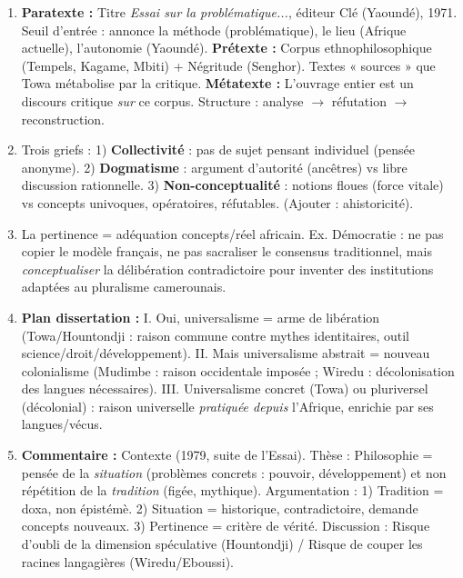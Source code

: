 \documentclass[11pt]{article}
\begin{document}
\begin{corrige}
\begin{enumerate}
    \item \textbf{Paratexte :} Titre \emph{Essai sur la problématique...}, éditeur Clé (Yaoundé), 1971. Seuil d'entrée : annonce la méthode (problématique), le lieu (Afrique actuelle), l'autonomie (Yaoundé). \textbf{Prétexte :} Corpus ethnophilosophique (Tempels, Kagame, Mbiti) + Négritude (Senghor). Textes « sources » que Towa métabolise par la critique. \textbf{Métatexte :} L'ouvrage entier est un discours critique \emph{sur} ce corpus. Structure : analyse $\rightarrow$ réfutation $\rightarrow$ reconstruction.
    \item Trois griefs : 1) \textbf{Collectivité} : pas de sujet pensant individuel (pensée anonyme). 2) \textbf{Dogmatisme} : argument d'autorité (ancêtres) vs libre discussion rationnelle. 3) \textbf{Non-conceptualité} : notions floues (force vitale) vs concepts univoques, opératoires, réfutables. (Ajouter : ahistoricité).
    \item La pertinence = adéquation concepts/réel africain. Ex. Démocratie : ne pas copier le modèle français, ne pas sacraliser le consensus traditionnel, mais \emph{conceptualiser} la délibération contradictoire pour inventer des institutions adaptées au pluralisme camerounais.
    \item \textbf{Plan dissertation :} I. Oui, universalisme = arme de libération (Towa/Hountondji : raison commune contre mythes identitaires, outil science/droit/développement). II. Mais universalisme abstrait = nouveau colonialisme (Mudimbe : raison occidentale imposée ; Wiredu : décolonisation des langues nécessaires). III. Universalisme concret (Towa) ou pluriversel (décolonial) : raison universelle \emph{pratiquée depuis} l'Afrique, enrichie par ses langues/vécus.
    \item \textbf{Commentaire :} Contexte (1979, suite de l'Essai). Thèse : Philosophie = pensée de la \emph{situation} (problèmes concrets : pouvoir, développement) et non répétition de la \emph{tradition} (figée, mythique). Argumentation : 1) Tradition = doxa, non épistémè. 2) Situation = historique, contradictoire, demande concepts nouveaux. 3) Pertinence = critère de vérité. Discussion : Risque d'oubli de la dimension spéculative (Hountondji) / Risque de couper les racines langagières (Wiredu/Eboussi).
\end{enumerate}
\end{corrige}
\end{document}
